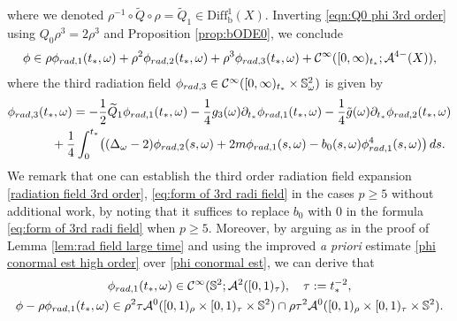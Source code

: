 \documentclass[10pt,a4paper,reqno]{amsart}
\newcommand{\CI}{\mathcal{C}^\infty}
\newcommand{\A}{\mathcal{A}}
\newcommand{\pa}{\partial}
\renewcommand{\S}{{\mathbb S}}
\theoremstyle{definition}
\theoremstyle{remark}
\numberwithin{equation}{section}
\newcommand{\ts}{t_*}
\newcommand{\Diffb}{\mathrm{Diff}_\mathrm{b}}
\begin{document}
where we denoted $\rho^{-1}\circ\widetilde{Q}\circ \rho = \widetilde{Q}_1 \in\Diffb^1(X)$. Inverting \eqref{eqn:Q0 phi 3rd order} using $Q_0\rho^3 = 2\rho^3$ and Proposition \ref{prop:bODE0}, we conclude
\begin{equation}
\label{radiation field 3rd order}
    \phi \in \rho\phi_{\rm{rad},1}(\ts,\omega) + \rho^2\phi_{\rm{rad},2}(\ts,\omega) + \rho^3\phi_{\rm{rad},3}(\ts,\omega) + \CI([0,\infty)_{t_*}; \A^{4-}(X)),
\end{equation}
where the third radiation field $\phi_{\rm{rad},3}\in\CI([0,\infty)_{t_*}\times\S_{\omega}^2)$ is given by
\begin{equation}
\label{eq:form of 3rd radi field}
    \begin{split}
         \phi_{\rm{rad},3}&(\ts,\omega) =  -\frac{1}{2}\widetilde{Q}_1 \phi_{\rm{rad},1}(\ts,\omega) - \frac{1}{4}g_3(\omega)\pa_{\ts}\phi_{\rm{rad},1}(\ts,\omega) - \frac{1}{4} \tilde{g}(\omega) \pa_{\ts}\phi_{\rm{rad},2}(\ts,\omega)\\
        &\quad + \frac{1}{4}\int_0^{\ts} \bigr((\Delta_\omega-2)\phi_{\rm{rad},2}(s,\omega) + 2m \phi_{\rm{rad},1}(s,\omega) - b_0(s,\omega) \phi_{\rm{rad},1}^4(s,\omega)\bigr)\,ds.
    \end{split}
\end{equation}
We remark that one can establish the third order radiation field expansion \eqref{radiation field 3rd order}, \eqref{eq:form of 3rd radi field} in the cases $p\geq 5$ without additional work, by noting that it suffices to replace $b_0$ with $0$ in the formula \eqref{eq:form of 3rd radi field} when $p\geq 5$. Moreover, by arguing as in the proof of Lemma \ref{lem:rad field large time} and using the improved \textit{a priori} estimate \eqref{phi conormal est high order} over \eqref{phi conormal est}, we can derive that
\begin{equation}
\label{rad field 1 decay sec 6}
    \begin{gathered}
			\phi_{\rm{rad},1}(\ts,\omega)\in \CI(\S^2;\A^2([0,1)_\tau),\quad \tau := \ts^{-2}, \\
			\phi - \rho \phi_{\rm{rad},1}(\ts,\omega) \in \rho^2 \tau \A^0 ([0,1)_\rho \times [0,1)_\tau \times \mathbb{S}^2)\cap \rho \tau^2 \A^0 ([0,1)_\rho \times [0,1)_\tau \times \mathbb{S}^2).
		\end{gathered}
\end{equation}
\end{document}
